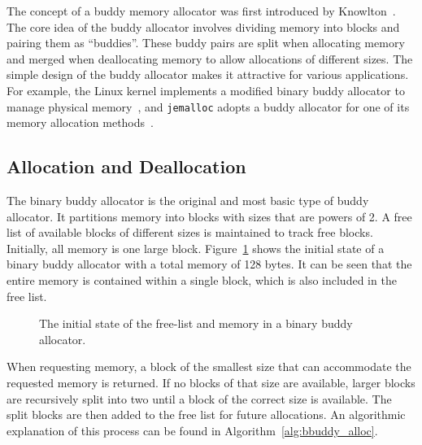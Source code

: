 The concept of a buddy memory allocator was first introduced by Knowlton~\cite{buddyog}. The core idea of the buddy allocator involves dividing memory into blocks and pairing them as ``buddies''. These buddy pairs are split when allocating memory and merged when deallocating memory to allow allocations of different sizes. The simple design of the buddy allocator makes it attractive for various applications. For example, the Linux kernel implements a modified binary buddy allocator to manage physical memory~\cite{linuxbuddy}, and \texttt{jemalloc} adopts a buddy allocator for one of its memory allocation methods~\cite{jemalloc}.

\subsection{Allocation and Deallocation}
The binary buddy allocator is the original and most basic type of buddy allocator. It partitions memory into blocks with sizes that are powers of 2. A free list of available blocks of different sizes is maintained to track free blocks. Initially, all memory is one large block. Figure~\ref{fig:buddystart} shows the initial state of a binary buddy allocator with a total memory of 128 bytes. It can be seen that the entire memory is contained within a single block, which is also included in the free list.

\begin{figure}[h]
  \centering
  
  \caption{The initial state of the free-list and memory in a binary buddy allocator.}
  \label{fig:buddystart}
\end{figure}

When requesting memory, a block of the smallest size that can accommodate the requested memory is returned. If no blocks of that size are available, larger blocks are recursively split into two until a block of the correct size is available. The split blocks are then added to the free list for future allocations. An algorithmic explanation of this process can be found in Algorithm~\ref{alg:bbuddy_alloc}.

